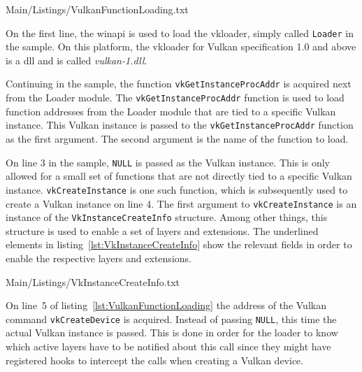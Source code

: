       
      {Main/Listings/VulkanFunctionLoading.txt}

      On the first line, the \gls{winapi} is used to load the \gls{vkloader}, simply called \lstinline{Loader} in the sample.
      On this platform, the \gls{vkloader} for Vulkan specification 1.0 and above is a \gls{dll} and is called \textit{vulkan-1.dll}.

      Continuing in the sample, the function \lstinline{vkGetInstanceProcAddr} is acquired next from the Loader module.
      The \lstinline{vkGetInstanceProcAddr} function is used to load function addresses from the Loader module that are tied to a specific Vulkan instance.
      This Vulkan instance is passed to the \lstinline{vkGetInstanceProcAddr} function as the first argument.
      The second argument is the name of the function to load.

      On line 3 in the sample, \lstinline{NULL} is passed as the Vulkan instance.
      This is only allowed for a small set of functions that are not directly tied to a specific Vulkan instance.
      \lstinline{vkCreateInstance} is one such function, which is subsequently used to create a Vulkan instance on line 4.
      The first argument to \lstinline{vkCreateInstance} is an instance of the \lstinline{VkInstanceCreateInfo} structure.
      Among other things, this structure is used to enable a set of layers and extensions.
      The underlined elements in listing~\ref{lst:VkInstanceCreateInfo} show the relevant fields in order to enable the respective layers and extensions.

      
      {Main/Listings/VkInstanceCreateInfo.txt}

      On line~5 of listing~\ref{lst:VulkanFunctionLoading} the address of the Vulkan command \lstinline{vkCreateDevice} is acquired.
      Instead of passing \lstinline{NULL}, this time the actual Vulkan instance is passed.
      This is done in order for the loader to know which active layers have to be notified about this call since they might have registered hooks to intercept the calls when creating a Vulkan device.

